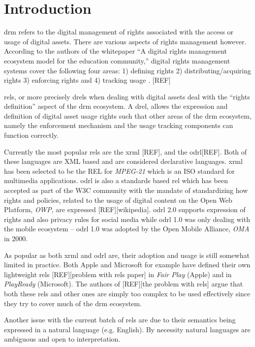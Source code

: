 \chapter{Introduction}
\ac{drm} refers to the digital management of rights associated with the access or usage of digital assets. There are various aspects of rights management however. According to the authors of the whitepaper ``A digital rights management ecosystem model for the education community,'' digital rights management systems cover the following four areas: 1) defining rights 2) distributing/acquiring rights 3) enforcing rights and 4) tracking usage \cite{collier}. [REF]

\ac{rel}s, or more precisely \ac{drel}s when dealing with digital assets deal with the ``rights definition'' aspect of the \ac{drm} ecosystem. A \ac{drel}, allows the expression and definition of digital asset usage rights such that other areas of the \ac{drm} ecosystem, namely the enforcement mechanism and the usage tracking components can function correctly.

Currently the most popular \ac{rel}s are the \ac{xrml} [REF], and the \ac{odrl}[REF]. Both of these languages are XML based and are considered declarative languages. \ac{xrml} has been selected to be the REL for \emph{MPEG-21} which is an ISO standard for multimedia applications. \ac{odrl} is also a standards based \ac{rel} which has been accepted as part of the W3C community with the mandate of standardizing how rights and policies, related to the usage of digital content on the Open Web Platform, \emph{OWP}, are expressed [REF][wikipedia]. \ac{odrl} 2.0 supports expression of rights and also privacy rules for social media while \ac{odrl} 1.0 was only dealing with the mobile ecosystem -- \ac{odrl} 1.0 was adopted by the Open Mobile Alliance, \emph{OMA} in 2000.

As popular as both \ac{xrml} and \ac{odrl} are, their adoption and usage is still somewhat limited in practice. Both Apple and Microsoft for example have defined their own lightweight \ac{rel}s [REF][problem with \ac{rel}s paper] in \emph{Fair Play} (Apple) and in \emph{PlayReady} (Microsoft). The authors of [REF][the problem with \ac{rel}s] argue that both these \ac{rel}s and other ones are simply too complex to be used effectively since they try to cover much of the \ac{drm} ecosystem. 

Another issue with the current batch of \ac{rel}s are due to their semantics being expressed in a natural language (e.g. English). By necessity natural languages are ambiguous and open to interpretation. 

